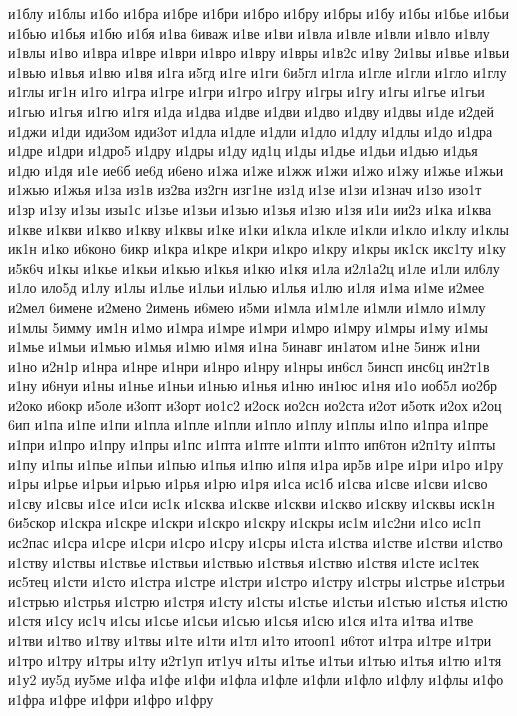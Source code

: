 {и1блу
и1блы
и1бо
и1бра
и1бре
и1бри
и1бро
и1бру
и1бры
и1бу
и1бы
и1бье
и1бьи
и1бью
и1бья
и1бю
и1бя
и1ва
6иваж
и1ве
и1ви
и1вла
и1вле
и1вли
и1вло
и1влу
и1влы
и1во
и1вра
и1вре
и1ври
и1вро
и1вру
и1вры
и1в2с
и1ву
2и1вы
и1вье
и1вьи
и1вью
и1вья
и1вю
и1вя
и1га
и5гд
и1ге
и1ги
6и5гл
и1гла
и1гле
и1гли
и1гло
и1глу
и1глы
иг1н
и1го
и1гра
и1гре
и1гри
и1гро
и1гру
и1гры
и1гу
и1гы
и1гье
и1гьи
и1гью
и1гья
и1гю
и1гя
и1да
и1два
и1две
и1дви
и1дво
и1дву
и1двы
и1де
и2дей
и1джи
и1ди
иди3ом
иди3от
и1дла
и1дле
и1дли
и1дло
и1длу
и1длы
и1до
и1дра
и1дре
и1дри
и1дро5
и1дру
и1дры
и1ду
ид1ц
и1ды
и1дье
и1дьи
и1дью
и1дья
и1дю
и1дя
и1е
ие6б
ие6д
и6ено
и1жа
и1же
и1жж
и1жи
и1жо
и1жу
и1жье
и1жьи
и1жью
и1жья
и1за
из1в
из2ва
из2гн
изг1не
из1д
и1зе
и1зи
и1знач
и1зо
изо1т
и1зр
и1зу
и1зы
изы1с
и1зье
и1зьи
и1зью
и1зья
и1зю
и1зя
и1и
ии2з
и1ка
и1ква
и1кве
и1кви
и1кво
и1кву
и1квы
и1ке
и1ки
и1кла
и1кле
и1кли
и1кло
и1клу
и1клы
ик1н
и1ко
и6коно
6икр
и1кра
и1кре
и1кри
и1кро
и1кру
и1кры
ик1ск
икс1ту
и1ку
и5к6ч
и1кы
и1кье
и1кьи
и1кью
и1кья
и1кю
и1кя
и1ла
и2л1а2ц
и1ле
и1ли
ил6лу
и1ло
ило5д
и1лу
и1лы
и1лье
и1льи
и1лью
и1лья
и1лю
и1ля
и1ма
и1ме
и2мее
и2мел
6имене
и2мено
2имень
и6мею
и5ми
и1мла
и1м1ле
и1мли
и1мло
и1млу
и1млы
5имму
им1н
и1мо
и1мра
и1мре
и1мри
и1мро
и1мру
и1мры
и1му
и1мы
и1мье
и1мьи
и1мью
и1мья
и1мю
и1мя
и1на
5инавг
ин1атом
и1не
5инж
и1ни
и1но
и2н1р
и1нра
и1нре
и1нри
и1нро
и1нру
и1нры
ин6сл
5инсп
инс6ц
ин2т1в
и1ну
и6нуи
и1ны
и1нье
и1ньи
и1нью
и1нья
и1ню
ин1юс
и1ня
и1о
иоб5л
ио2бр
и2око
и6окр
и5оле
и3опт
и3орт
ио1с2
и2оск
ио2сн
ио2ста
и2от
и5отк
и2ох
и2оц
6ип
и1па
и1пе
и1пи
и1пла
и1пле
и1пли
и1пло
и1плу
и1плы
и1по
и1пра
и1пре
и1при
и1про
и1пру
и1пры
и1пс
и1пта
и1пте
и1пти
и1пто
ип6тон
и2п1ту
и1пты
и1пу
и1пы
и1пье
и1пьи
и1пью
и1пья
и1пю
и1пя
и1ра
ир5в
и1ре
и1ри
и1ро
и1ру
и1ры
и1рье
и1рьи
и1рью
и1рья
и1рю
и1ря
и1са
ис1б
и1сва
и1све
и1сви
и1сво
и1сву
и1свы
и1се
и1си
ис1к
и1сква
и1скве
и1скви
и1скво
и1скву
и1сквы
иск1н
6и5скор
и1скра
и1скре
и1скри
и1скро
и1скру
и1скры
ис1м
и1с2ни
и1со
ис1п
ис2пас
и1сра
и1сре
и1сри
и1сро
и1сру
и1сры
и1ста
и1ства
и1стве
и1стви
и1ство
и1ству
и1ствы
и1ствье
и1ствьи
и1ствью
и1ствья
и1ствю
и1ствя
и1сте
ис1тек
ис5тец
и1сти
и1сто
и1стра
и1стре
и1стри
и1стро
и1стру
и1стры
и1стрье
и1стрьи
и1стрью
и1стрья
и1стрю
и1стря
и1сту
и1сты
и1стье
и1стьи
и1стью
и1стья
и1стю
и1стя
и1су
ис1ч
и1сы
и1сье
и1сьи
и1сью
и1сья
и1сю
и1ся
и1та
и1тва
и1тве
и1тви
и1тво
и1тву
и1твы
и1те
и1ти
и1тл
и1то
итооп1
и6тот
и1тра
и1тре
и1три
и1тро
и1тру
и1тры
и1ту
и2т1уп
ит1уч
и1ты
и1тье
и1тьи
и1тью
и1тья
и1тю
и1тя
и1у2
иу5д
иу5ме
и1фа
и1фе
и1фи
и1фла
и1фле
и1фли
и1фло
и1флу
и1флы
и1фо
и1фра
и1фре
и1фри
и1фро
и1фру
}
